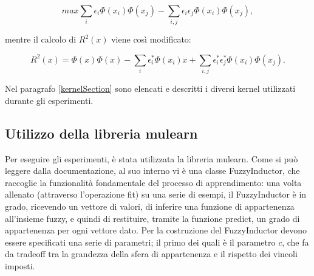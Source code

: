 \documentclass[12pt,a4paper]{report}
\begin{document}
\[ max \sum_{i}\epsilon_i\Phi(x_i)\Phi(x_j) - \sum_{i,j}\epsilon_i\epsilon_j\Phi(x_i)\Phi(x_j),\]

mentre il calcolo di $R^2(x)$ viene così modificato:

\[ R^2(x) = \Phi(x)\Phi(x) - \sum_{i}\epsilon_i^*\Phi(x_i)x + \sum_{i,j}\epsilon_i^*\epsilon_j^*\Phi(x_i)\Phi(x_j).\]

Nel paragrafo \ref{kernelSection} sono elencati e descritti i diversi kernel utilizzati durante gli esperimenti.

\subsection{Utilizzo della libreria mulearn}\label{FuzzifierSection}

Per eseguire gli esperimenti, è stata utilizzata la libreria mulearn\cite{mulearn}.
Come si può leggere dalla documentazione, al suo interno vi è una classe FuzzyInductor, che raccoglie la funzionalità fondamentale del processo di apprendimento: una volta allenato (attraverso l'operazione fit) su una serie di esempi, il FuzzyInductor è in grado, ricevendo un vettore di valori, di inferire una funzione di appartenenza all'insieme fuzzy, e quindi di restituire, tramite la funzione predict, un grado di appartenenza per ogni vettore dato.
Per la costruzione del FuzzyInductor devono essere specificati una serie di parametri; il primo dei quali è il parametro $c$, che fa da tradeoff tra la grandezza della sfera di appartenenza e il rispetto dei vincoli imposti. 
\end{document}
